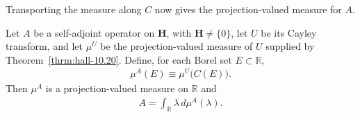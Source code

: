 Transporting the measure along $C$ now gives the projection-valued measure for $A$.

\begin{theorem}
    \label{thrm:hall-10.30}
    \leanok
    Let $A$ be a self-adjoint operator on $\mathbf{H}$, with $\mathbf{H} \ne \{0\}$, let $U$ be its Cayley transform, and let $\mu^U$ be the projection-valued measure of $U$ supplied by Theorem~\ref{thrm:hall-10.20}. Define, for each Borel set $E \subset \mathbb{R}$,
    \begin{align}
        \mu^A(E) \equiv \mu^U\big( C(E) \big).
    \end{align}
    Then $\mu^A$ is a projection-valued measure on $\mathbb{R}$ and
    \begin{align}
        A = \int_{\mathbb{R}} \lambda \, d\mu^A(\lambda).
    \end{align}
\end{theorem}
